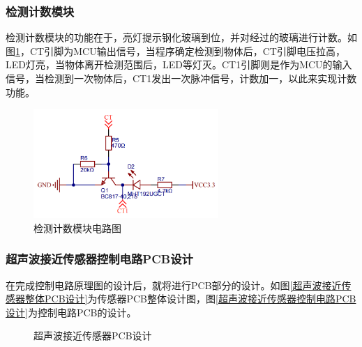 \subsubsection{检测计数模块}
检测计数模块的功能在于，亮灯提示钢化玻璃到位，并对经过的玻璃进行计数。如图\ref{检测计数模块电路图}，CT引脚为MCU输出信号，当程序确定检测到物体后，CT引脚电压拉高，LED灯亮，当物体离开检测范围后，LED等灯灭。CT1引脚则是作为MCU的输入信号，当检测到一次物体后，CT1发出一次脉冲信号，计数加一，以此来实现计数功能。
\begin{figure}[ht]
	\centering
	\includegraphics[width=7cm]{figure/detection count circuit.png}
	\caption{检测计数模块电路图}
	\label{检测计数模块电路图}
\end{figure}

\subsubsection{超声波接近传感器控制电路PCB设计}
在完成控制电路原理图的设计后，就将进行PCB部分的设计。如图\ref{超声波接近传感器整体PCB设计}为传感器PCB整体设计图，图\ref{超声波接近传感器控制电路PCB设计}为控制电路PCB的设计。
\begin{figure}[ht]
	\centering
	\caption{超声波接近传感器PCB设计}
	\label{超声波接近传感器PCB设计}
\end{figure}
